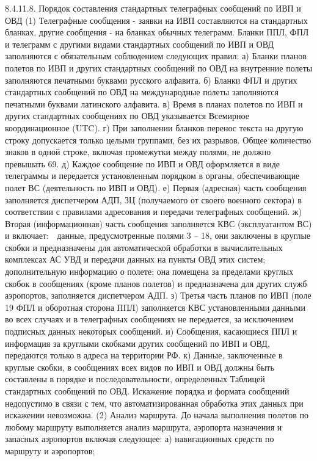 8.4.11.8. Порядок составления стандартных телеграфных сообщений по ИВП и ОВД
(1) Телеграфные сообщения - заявки на ИВП составляются на стандартных бланках, другие сообщения - на бланках обычных телеграмм.
Бланки ППЛ, ФПЛ и телеграмм с другими видами стандартных сообщений по ИВП и ОВД заполняются с обязательным соблюдением следующих правил:
а)	Бланки планов полетов по ИВП и других стандартных сообщений по ОВД на внутренние полеты заполняются печатными буквами русского алфавита.
б)	Бланки ФПЛ и других стандартных сообщений по ОВД на международные полеты заполняются печатными буквами латинского алфавита.
в)	Время в планах полетов по ИВП и других стандартных сообщениях по ОВД указывается Всемирное координационное (UTC).
г)	При заполнении бланков перенос текста на другую строку допускается только целыми группами, без их разрывов. Общее количество знаков в одной строке, включая промежутки между полями, не должно превышать 69.
д)	Каждое сообщение по ИВП и ОВД оформляется в виде телеграммы и передается установленным порядком в органы, обеспечивающие полет ВС (деятельность по ИВП и ОВД).
е)	Первая (адресная) часть сообщения заполняется диспетчером АДП, ЗЦ (получаемого от своего военного сектора) в соответствии с правилами адресования и передачи телеграфных сообщений.
ж)	Вторая (информационная) часть сообщения заполняется КВС (эксплуатантом ВС) и включает:
	данные, предусмотренные полями 3 – 18, они заключены в круглые скобки и предназначены для автоматической обработки в вычислительных комплексах АС УВД и передачи данных на пункты ОВД этих систем;
	дополнительную информацию о полете; она помещена за пределами круглых скобок в сообщениях (кроме планов полетов) и предназначена для других служб аэропортов, заполняется диспетчером АДП.
з)	Третья часть планов по ИВП (поле 19 ФПЛ и оборотная сторона ППЛ) заполняется КВС установленными данными во всех случаях и в телеграфных сообщениях не передается, за исключением подписных данных некоторых сообщений.
и)	Сообщения, касающиеся ППЛ и информация за круглыми скобками других сообщений по ИВП и ОВД, передаются только в адреса на территории РФ.
к)	Данные, заключенные в круглые скобки, в сообщениях всех видов по ИВП и ОВД должны быть составлены в порядке и последовательности, определенных Таблицей стандартных сообщений по ОВД. Искажение порядка и формата сообщений недопустимо в связи с тем, что автоматизированная обработка этих данных при искажении невозможна.
(2) Анализ маршрута.
До начала выполнения полетов по любому маршруту выполняется анализ маршрута, аэропорта назначения и запасных аэропортов включая следующее:
а)	навигационных средств по маршруту и аэропортов;
